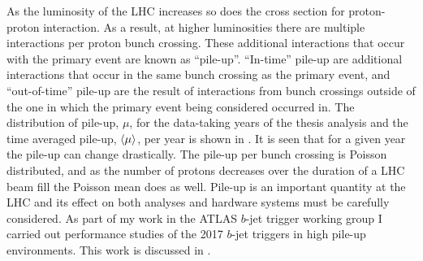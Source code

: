 As the luminosity of the LHC increases so does the cross section for proton-proton interaction.
As a result, at higher luminosities there are multiple interactions per proton bunch crossing.
These additional interactions that occur with the primary event are known as ``pile-up''.
``In-time'' pile-up are additional interactions that occur in the same bunch crossing as the primary event, and ``out-of-time'' pile-up are the result of interactions from bunch crossings outside of the one in which the primary event being considered occurred in.
The distribution of pile-up, $\mu$, for the data-taking years of the thesis analysis and the time averaged pile-up, $\braket{\mu}$, per year is shown in .
It is seen that for a given year the pile-up can change drastically.
The pile-up per bunch crossing is Poisson distributed, and as the number of protons decreases over the duration of a LHC beam fill the Poisson mean does as well.
Pile-up is an important quantity at the LHC and its effect on both analyses and hardware systems must be carefully considered.
As part of my work in the ATLAS $b$-jet trigger working group I carried out performance studies of the 2017 $b$-jet triggers in high pile-up environments.
This work is discussed in .

